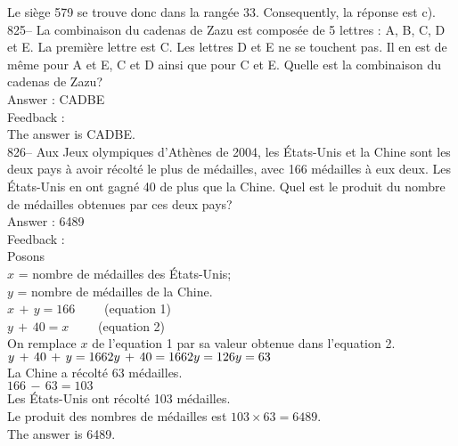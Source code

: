 \documentclass[letterpaper, 12pt]{article}
\begin{document}
Le si\`ege 579 se trouve donc dans la rang\'ee 33.  Consequently, la
r\'eponse est c).\\

825-- La combinaison du cadenas de Zazu est compos\'ee de 5 lettres : A, B,
C, D et E.  La premi\`ere lettre est C.  Les lettres D et E ne se touchent
pas.  Il en est de m\^eme pour A et E, C et D ainsi que pour C et E.  Quelle
est la combinaison du cadenas de Zazu?\\

Answer : CADBE\\

Feedback : \\
The answer is CADBE.\\

826-- Aux Jeux olympiques d'Ath\`enes de 2004, les \'Etats-Unis et la Chine
sont les deux pays \`a avoir r\'ecolt\'e le plus de m\'edailles,  avec 166
m\'edailles \`a eux deux.  Les \'Etats-Unis en ont gagn\'e 40 de plus que la
Chine.  Quel est le produit du nombre de m\'edailles obtenues par ces deux
pays?\\

Answer : 6489\\

Feedback : \\
Posons\\
$x$ = nombre de m\'edailles des \'Etats-Unis;\\
$y$ = nombre de m\'edailles de la Chine.\\

$x\,+\,y=166 \qquad$ (equation 1)\\
$y\,+\,40=x \qquad$ (equation 2)\\

On remplace $x$ de l'equation 1 par sa valeur obtenue dans l'equation
2.\\
$y\,+\,40\,+\,y=166\\
2y\,+\,40=166\\
2y=126\\
y=63$\\
La Chine a r\'ecolt\'e 63 m\'edailles.\\

$166\,-\,63=103$\\
Les \'Etats-Unis ont r\'ecolt\'e 103 m\'edailles.  \\

Le produit des nombres de m\'edailles est $103\times63=6489$.\\
The answer is 6489.\\
\end{document}
